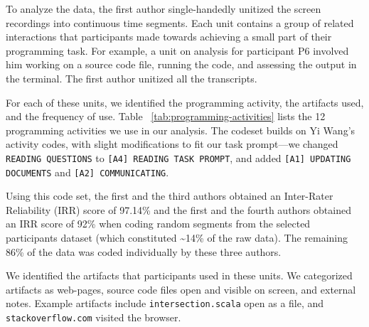 


To analyze the data, the first author single-handedly unitized the screen recordings into continuous time segments. Each unit contains a group of related interactions that participants made towards achieving a small part of their programming task. For example, a unit on analysis for participant P6 involved him working on a source code file, running the code, and assessing the output in the terminal. The first author unitized all the transcripts.

For each of these units, we identified the programming activity, the artifacts used, and the frequency of use. Table ~\ref{tab:programming-activities} lists  the 12 programming activities we use in our analysis. The codeset builds on Yi Wang's~\cite{Wang:2017} activity codes, with slight modifications to fit our task prompt---we changed \texttt{READING QUESTIONS} to \texttt{[A4] READING TASK PROMPT}, and added \texttt{[A1] UPDATING DOCUMENTS} and \texttt{[A2] COMMUNICATING}.

Using this code set, the first and the third authors obtained an Inter-Rater Reliability (IRR) score of 97.14\% and the first and the fourth authors obtained an IRR score of 92\% when coding random segments from the selected participants dataset (which constituted \textasciitilde14\% of the raw data). The remaining 86\% of the data was coded individually by these three authors.

We identified the artifacts that participants used in these units. We categorized artifacts as web-pages, source code files open and visible on screen, and external notes. Example artifacts include \texttt{intersection.scala} open as a file, and \texttt{stackoverflow.com} visited the browser. 



